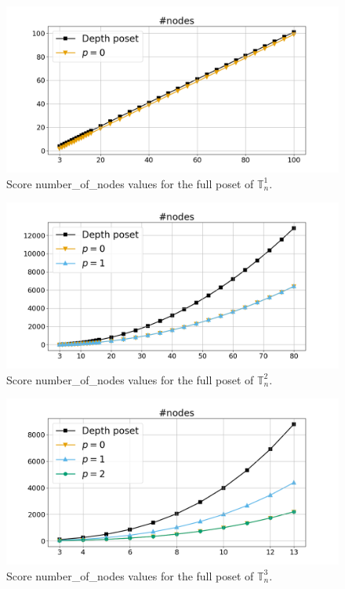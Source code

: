 \documentclass{article}
\begin{document}
    \begin{figure}[h!]
        \centering
        \hspace*{-0.24\textwidth}
        \includegraphics[width=1.4\textwidth]{pics/extended torus scores/score=number-of-nodes, dim=1, object=full.png}
        \caption{Score number\_of\_nodes values for the full poset of $\mathbb{T}_n^{1}$.}
        \label{fig:numberofnodes-full1}
    \end{figure}
    \begin{figure}[h!]
        \centering
        \hspace*{-0.24\textwidth}
        \includegraphics[width=1.4\textwidth]{pics/extended torus scores/score=number-of-nodes, dim=2, object=full.png}
        \caption{Score number\_of\_nodes values for the full poset of $\mathbb{T}_n^{2}$.}
        \label{fig:numberofnodes-full2}
    \end{figure}
    \begin{figure}[h!]
        \centering
        \hspace*{-0.24\textwidth}
        \includegraphics[width=1.4\textwidth]{pics/extended torus scores/score=number-of-nodes, dim=3, object=full.png}
        \caption{Score number\_of\_nodes values for the full poset of $\mathbb{T}_n^{3}$.}
        \label{fig:numberofnodes-full3}
    \end{figure}
\end{document}
